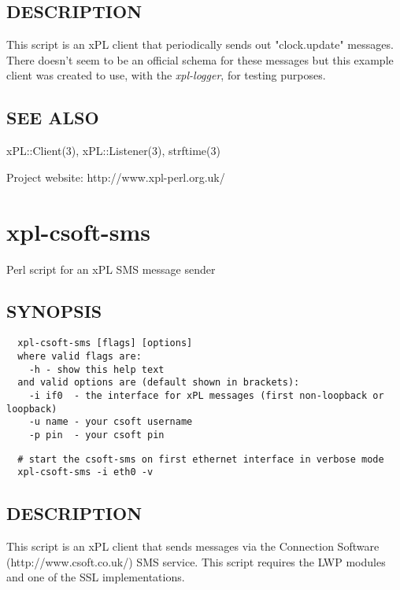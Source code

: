 \documentclass[12pt,a4paper]{article}
\begin{document}
\subsection*{DESCRIPTION\label{xpl-clock_DESCRIPTION}}


This script is an xPL client that periodically sends out
"clock.update" messages.  There doesn't seem to be an official
schema for these messages but this example client was created
to use, with the \emph{xpl-logger}, for testing purposes.

\subsection*{SEE ALSO\label{xpl-clock_SEE_ALSO}}


xPL::Client(3), xPL::Listener(3), strftime(3)



Project website: http://www.xpl-perl.org.uk/

\newpage
\section{xpl-csoft-sms\label{xpl-csoft-sms}}


Perl script for an xPL SMS message sender

\subsection*{SYNOPSIS\label{xpl-csoft-sms_SYNOPSIS}}
\begin{verbatim}
  xpl-csoft-sms [flags] [options]
  where valid flags are:
    -h - show this help text
  and valid options are (default shown in brackets):
    -i if0  - the interface for xPL messages (first non-loopback or loopback)
    -u name - your csoft username
    -p pin  - your csoft pin
\end{verbatim}
\begin{verbatim}
  # start the csoft-sms on first ethernet interface in verbose mode
  xpl-csoft-sms -i eth0 -v
\end{verbatim}
\subsection*{DESCRIPTION\label{xpl-csoft-sms_DESCRIPTION}}


This script is an xPL client that sends messages via the Connection
Software (http://www.csoft.co.uk/) SMS service.  This script requires
the LWP modules and one of the SSL implementations.
\end{document}
